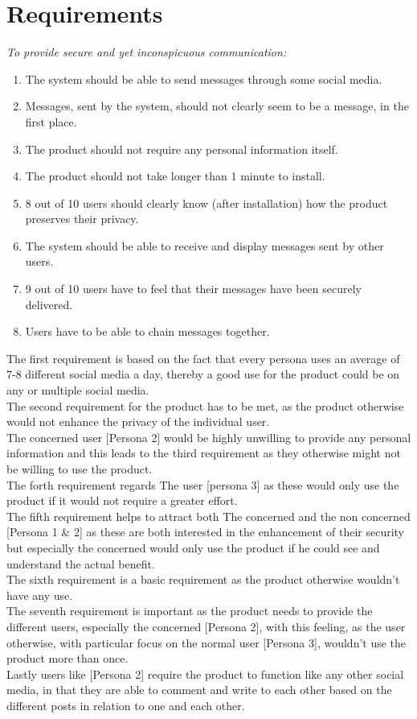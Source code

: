 \section{Requirements}
\textit{To provide secure and yet inconspicuous communication:}
\begin{enumerate}
    \item The system should be able to send messages through some social media.
    \item Messages, sent by the system, should not clearly seem to be a message, in the first place.
    \item The product should not require any personal information itself.
    \item The product should not take longer than 1 minute to install.
    \item 8 out of 10 users should clearly know (after installation) how the product preserves their privacy.
    \item The system should be able to receive and display messages sent by other users.
    \item 9 out of 10 users have to feel that their messages have been securely delivered.
    \item Users have to be able to chain messages together.
\end{enumerate}
\noindent
The first requirement is based on the fact that every persona uses an average of 7-8 different social media a day, thereby a good use for the product could be on any or multiple social media.\\
The second requirement for the product has to be met, as the product otherwise would not enhance the privacy of the individual user.\\
The concerned user [Persona 2] would be highly unwilling to provide any personal information and this leads to the third requirement as they otherwise might not be willing to use the product.\\
\newpage\noindent
The forth requirement regards The user [persona 3] as these would only use the product if it would not require a greater effort.\\
The fifth requirement helps to attract both The concerned and the non concerned [Persona 1 \& 2] as these are both interested in the enhancement of their security but especially the concerned would only use the product if he could see and understand the actual benefit.\\
The sixth requirement is a basic requirement as the product otherwise wouldn't have any use.\\
The seventh requirement is important as the product needs to provide the different users, especially the concerned [Persona 2], with this feeling, as the user otherwise, with particular focus on the normal user [Persona 3], wouldn't use the product more than once.\\
Lastly users like [Persona 2] require the product to function like any other social media, in that they are able to comment and write to each other based on the different posts in relation to one and each other.

